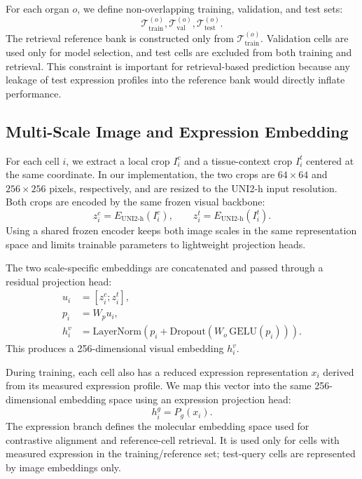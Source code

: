 \documentclass[sigconf]{acmart}
\begin{document}
For each organ $o$, we define non-overlapping training, validation, and test sets:
\begin{equation}
    \mathcal{T}^{(o)}_{\mathrm{train}},
    \mathcal{T}^{(o)}_{\mathrm{val}},
    \mathcal{T}^{(o)}_{\mathrm{test}}.
\end{equation}
The retrieval reference bank is constructed only from $\mathcal{T}^{(o)}_{\mathrm{train}}$. Validation cells are used only for model selection, and test cells are excluded from both training and retrieval. This constraint is important for retrieval-based prediction because any leakage of test expression profiles into the reference bank would directly inflate performance.

\subsection{Multi-Scale Image and Expression Embedding}

For each cell $i$, we extract a local crop $I_i^c$ and a tissue-context crop $I_i^t$ centered at the same coordinate. In our implementation, the two crops are $64\times64$ and $256\times256$ pixels, respectively, and are resized to the UNI2-h input resolution. Both crops are encoded by the same frozen visual backbone:
\begin{equation}
    z_i^c = E_{\mathrm{UNI2\text{-}h}}(I_i^c), \qquad
    z_i^t = E_{\mathrm{UNI2\text{-}h}}(I_i^t).
\end{equation}
Using a shared frozen encoder keeps both image scales in the same representation space and limits trainable parameters to lightweight projection heads.

The two scale-specific embeddings are concatenated and passed through a residual projection head:
\begin{align}
    u_i &= [z_i^c; z_i^t], \\
    p_i &= W_p u_i, \\
    h_i^v &= \mathrm{LayerNorm}\left(
        p_i + \mathrm{Dropout}\left(W_o\,\mathrm{GELU}(p_i)\right)
    \right).
\end{align}
This produces a 256-dimensional visual embedding $h_i^v$.

During training, each cell also has a reduced expression representation $x_i$ derived from its measured expression profile. We map this vector into the same 256-dimensional embedding space using an expression projection head:
\begin{equation}
    h_i^g = P_g(x_i).
\end{equation}
The expression branch defines the molecular embedding space used for contrastive alignment and reference-cell retrieval. It is used only for cells with measured expression in the training/reference set; test-query cells are represented by image embeddings only.
\end{document}

